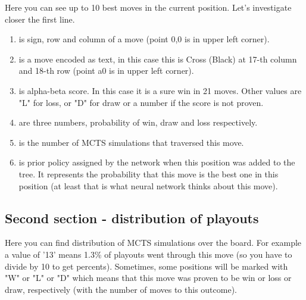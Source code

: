 \documentclass[12pt,a4paper]{article}
\begin{document}
Here you can see up to 10 best moves in the current position. Let's investigate closer the first line.
\begin{enumerate}[leftmargin=10em]
	\item[\text{CROSS  (17,16)}]{is sign, row and column of a move (point 0,0 is in upper left corner).}
	\item[\text{Xq17}]{is a move encoded as text, in this case this is Cross (Black) at 17-th column and 18-th row (point a0 is in upper left corner).}
	\item[\text{S= W21}]{is alpha-beta score. In this case it is a sure win in 21 moves. Other values are "L" for loss, or "D" for draw or a number if the score is not proven.}
	\item[\text{Q=0.983135 : 0.000009 : 0.016855}]{are three numbers, probability of win, draw and loss respectively.}
	\item[\text{Visits=13324}]{is the number of MCTS simulations that traversed this move.}
	\item[\text{P=0.013671}]{is prior policy assigned by the network when this position was added to the tree. It represents the probability that this move is the best one in this position (at least that is what neural network thinks about this move).}
\end{enumerate}

\subsection{Second section - distribution of playouts}
Here you can find distribution of MCTS simulations over the board. For example a value of '13' means 1.3{\%} of playouts went through this move (so you have to divide by 10 to get percents). Sometimes, some positions will be marked with "W" or "L" or "D" which means that this move was proven to be win or loss or draw, respectively (with the number of moves to this outcome).
\end{document}
